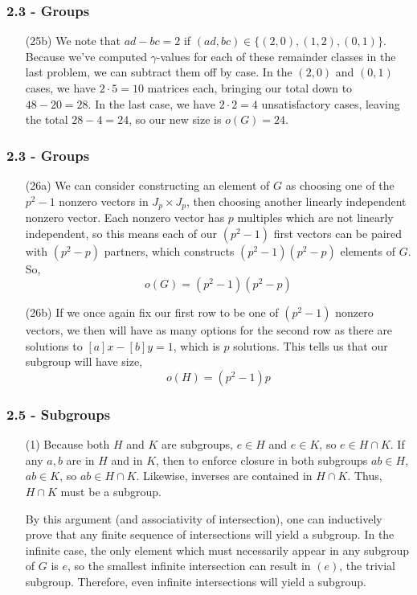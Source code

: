 \documentclass{beamer}
\begin{document}
\begin{frame}
\frametitle{2.3 - Groups}
\small
\begin{enumerate}
	\item[(25b)] We note that $ad - bc = 2$ if $(ad,bc) \in \{(2, 0), (1, 2), (0, 1)\}$. Because we've computed $\gamma$-values for each of these remainder classes in the last problem, we can subtract them off by case. In the $(2,0)$ and $(0, 1)$ cases, we have $2\cdot 5 = 10$ matrices each, bringing our total down to $48 - 20 = 28$. In the last case, we have $2\cdot 2 = 4$ unsatisfactory cases, leaving the total $28 - 4 = 24$, so our new size is $o(G) = 24$. 
\end{enumerate}
\end{frame}
\begin{frame}
\frametitle{2.3 - Groups}
\small
\begin{enumerate}
	\item[(26a)] We can consider constructing an element of $G$ as choosing one of the $p^2 - 1$ nonzero vectors in $J_p\times J_p$, then choosing another linearly independent nonzero vector. Each nonzero vector has $p$ multiples which are not linearly independent, so this means each of our $(p^2 - 1)$ first vectors can be paired with $(p^2 - p)$ partners, which constructs $(p^2 - 1)(p^2 - p)$ elements of $G$. So, 
	\begin{equation*}
	o(G) = (p^2 - 1)(p^2 - p)
	\end{equation*}
	\item[(26b)] If we once again fix our first row to be one of $(p^2 - 1)$ nonzero vectors, we then will have as many options for the second row as there are solutions to $[a]x - [b]y = 1$, which is $p$ solutions. This tells us that our subgroup will have size,
	\begin{equation*}
	o(H) = (p^2 - 1)p
	\end{equation*}
\end{enumerate}
\end{frame}
\begin{frame}
\frametitle{2.5 - Subgroups}
\small
\begin{enumerate}
	\item[(1)] \quad Because both $H$ and $K$ are subgroups, $e\in H$ and $e\in K$, so $e\in H\cap K$. If any $a,b$ are in $H$ and in $K$, then to enforce closure in both subgroups $ab\in H$, $ab\in K$, so $ab\in H\cap K$. Likewise, inverses are contained in $H\cap K$. Thus, $H\cap K$ must be a subgroup. 
	
	\quad By this argument (and associativity of intersection), one can inductively prove that any finite sequence of intersections will yield a subgroup. In the infinite case, the only element which must necessarily appear in any subgroup of $G$ is $e$, so the smallest infinite intersection can result in $(e)$, the trivial subgroup. Therefore, even infinite intersections will yield a subgroup.
\end{enumerate}
\end{frame}
\end{document}
